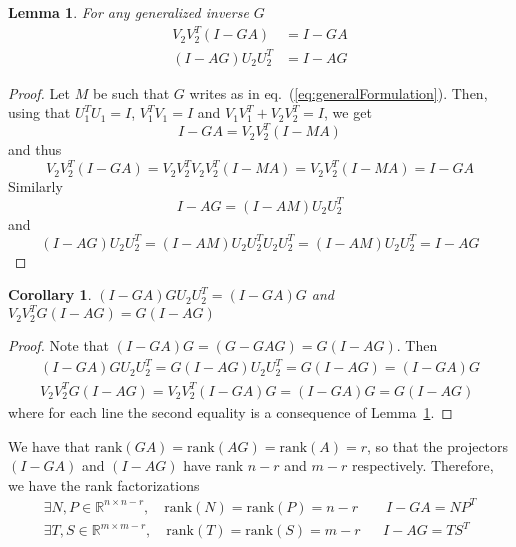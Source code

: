 \documentclass[]{article}
\newtheorem{corollary}[theorem]{Corollary}
\newtheorem{lemma}[theorem]{Lemma}
\theoremstyle{definition}
\begin{document}
\begin{lemma}
\label{lemma:projection}
For any generalized inverse $G$
	\begin{align*}
	V_2 V_2^T (I-GA) &= I-GA\\
	(I-AG)U_2U_2^T &= I-AG
	\end{align*}
\end{lemma}
\begin{proof}
Let $M$ be such that $G$ writes as in eq.~(\ref{eq:generalFormulation}). Then, using that $U_1^T U_1 = I$, $V_1^T V_1 = I$ and $V_1 V_1^T + V_2 V_2^T = I$, we get
\begin{equation*}
  I-GA = V_2 V_2^T (I-MA)
\end{equation*}
and thus
\begin{equation*}
  V_2 V_2^T (I-GA) = V_2 V_2^T V_2 V_2^T (I-MA) = V_2 V_2^T (I-MA) = I - GA
\end{equation*}
Similarly
\begin{equation*}
  I-AG = (I-AM)U_2 U_2^T
\end{equation*}
and
\begin{equation*}
  (I-AG)U_2 U_2^T = (I-AM)U_2 U_2^T U_2 U_2^T = (I-AM)U_2 U_2^T  = I-AG
\end{equation*}
\end{proof}

\begin{corollary}
\label{co:projection}
$(I-GA)G U_2 U_2^T = (I-GA)G$ and $V_2 V_2^T G(I-AG) = G(I-AG)$
\end{corollary}
\begin{proof}
Note that $(I-GA)G = (G - GAG) = G(I-AG)$. Then
\begin{align*}
  (I-GA)G U_2 U_2^T = G(I-AG) U_2 U_2^T = G(I-AG) = (I-GA)G \\
	V_2 V_2^T G(I-AG) = V_2 V_2^T (I-GA)G = (I-GA)G = G(I-AG)
\end{align*}
where for each line the second equality is a consequence of Lemma~\ref{lemma:projection}.
\end{proof}

We have that $\mathrm{rank}(GA) = \mathrm{rank}(AG) =  \mathrm{rank}(A) =  r$, so that the projectors $(I-GA)$ and $(I-AG)$ have rank $n-r$ and $m-r$ respectively.
Therefore, we have the rank factorizations
\begin{align*}
 \exists N,P\in \mathbb{R}^{n \times n-r}, \quad \mathrm{rank}(N) = \mathrm{rank}(P) = n-r &&\ I-GA = N P^T\\
  \exists T,S\in \mathbb{R}^{m \times m-r}, \quad \mathrm{rank}(T) = \mathrm{rank}(S) = m-r && I-AG = T S^T 
\end{align*}
\end{document}
